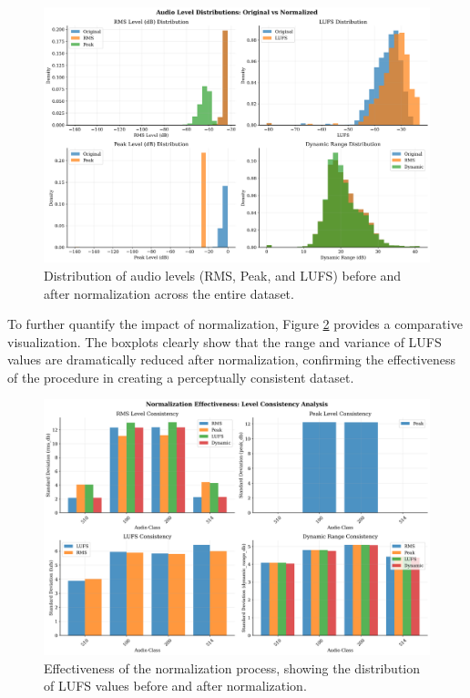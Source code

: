 \documentclass[12pt, a4paper]{article}
\begin{document}
\begin{figure}[h!]
    \centering
    \includegraphics[width=\textwidth]{img/level_distributions.png}
    \caption{Distribution of audio levels (RMS, Peak, and LUFS) before and after normalization across the entire dataset.}
    \label{fig:level_distributions}
\end{figure}

To further quantify the impact of normalization, Figure \ref{fig:norm_effectiveness} provides a comparative visualization. The boxplots clearly show that the range and variance of LUFS values are dramatically reduced after normalization, confirming the effectiveness of the procedure in creating a perceptually consistent dataset.

\begin{figure}[h!]
    \centering
    \includegraphics[width=\textwidth]{img/normalization_effectiveness.png}
    \caption{Effectiveness of the normalization process, showing the distribution of LUFS values before and after normalization.}
    \label{fig:norm_effectiveness}
\end{figure}
\end{document}
